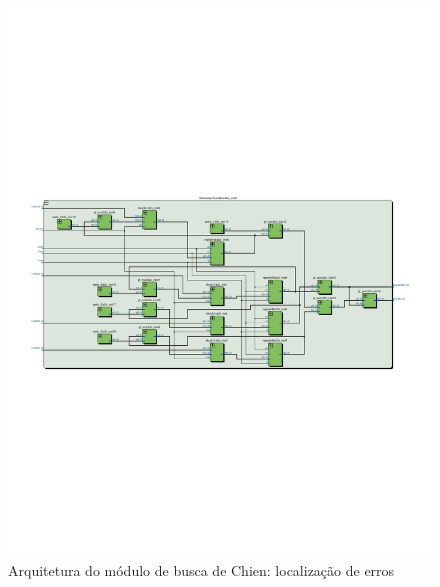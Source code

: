 	\begin{figure}[!htb]
		\caption{\label{fig_chienloc_arq} Arquitetura do módulo de busca de Chien: localização de erros}
		\centering
		\includegraphics[width=1\textwidth]{RS/ChienLocationRTL.pdf}
		\legend{}
	\end{figure}

